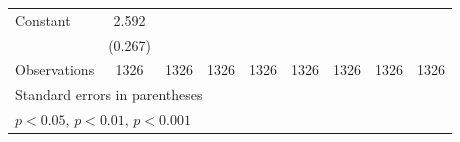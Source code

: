 \begin{table}[htbp]
\begin{tabular}{l*{8}{c}}
\addlinespace
Constant        &    2.592\sym{***}&                  &                  &                  &                  &                  &                  &                  \\
                &  (0.267)         &                  &                  &                  &                  &                  &                  &                  \\
\midrule
Observations    &     1326         &     1326         &     1326         &     1326         &     1326         &     1326         &     1326         &     1326         \\
\bottomrule
\multicolumn{9}{l}{\footnotesize Standard errors in parentheses}\\
\multicolumn{9}{l}{\footnotesize \sym{*} \(p<0.05\), \sym{**} \(p<0.01\), \sym{***} \(p<0.001\)}\\
\end{tabular}
\end{table}
